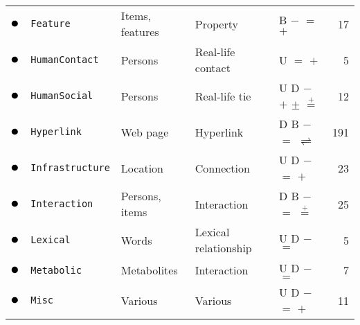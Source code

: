 \begin{tabular}{lllllr}
\textcolor{colorFeature}{$\newmoon$} &\texttt{Feature} & Items, features & Property & \phantom{U} \phantom{D} B $-$ $=$ $+$ \phantom{$\pm$} \phantom{$\stackrel{+}{=}$} \phantom{$*$} \phantom{$_*{}^*$} \phantom{$\rightleftharpoons$} \phantom{$++$}  &  17\\
\textcolor{colorHumanContact}{$\newmoon$} &\texttt{HumanContact} & Persons & Real-life contact & U \phantom{D} \phantom{B} \phantom{$-$} $=$ $+$ \phantom{$\pm$} \phantom{$\stackrel{+}{=}$} \phantom{$*$} \phantom{$_*{}^*$} \phantom{$\rightleftharpoons$} \phantom{$++$}  &  5\\
\textcolor{colorHumanSocial}{$\newmoon$} &\texttt{HumanSocial} & Persons & Real-life tie & U D \phantom{B} $-$ \phantom{$=$} $+$ $\pm$ $\stackrel{+}{=}$ \phantom{$*$} \phantom{$_*{}^*$} \phantom{$\rightleftharpoons$} \phantom{$++$}  &  12\\
\textcolor{colorHyperlink}{$\newmoon$} &\texttt{Hyperlink} & Web page & Hyperlink & \phantom{U} D B $-$ $=$ \phantom{$+$} \phantom{$\pm$} \phantom{$\stackrel{+}{=}$} \phantom{$*$} \phantom{$_*{}^*$} $\rightleftharpoons$ \phantom{$++$}  &  191\\
\textcolor{colorInfrastructure}{$\newmoon$} &\texttt{Infrastructure} & Location & Connection & U D \phantom{B} $-$ $=$ $+$ \phantom{$\pm$} \phantom{$\stackrel{+}{=}$} \phantom{$*$} \phantom{$_*{}^*$} \phantom{$\rightleftharpoons$} \phantom{$++$}  &  23\\
\textcolor{colorInteraction}{$\newmoon$} &\texttt{Interaction} & Persons, items & Interaction & \phantom{U} D B $-$ $=$ \phantom{$+$} \phantom{$\pm$} $\stackrel{+}{=}$ \phantom{$*$} \phantom{$_*{}^*$} \phantom{$\rightleftharpoons$} \phantom{$++$}  &  25\\
\textcolor{colorLexical}{$\newmoon$} &\texttt{Lexical} & Words & Lexical relationship & U D \phantom{B} $-$ $=$ \phantom{$+$} \phantom{$\pm$} \phantom{$\stackrel{+}{=}$} \phantom{$*$} \phantom{$_*{}^*$} \phantom{$\rightleftharpoons$} \phantom{$++$}  &  5\\
\textcolor{colorMetabolic}{$\newmoon$} &\texttt{Metabolic} & Metabolites & Interaction & U D \phantom{B} $-$ $=$ \phantom{$+$} \phantom{$\pm$} \phantom{$\stackrel{+}{=}$} \phantom{$*$} \phantom{$_*{}^*$} \phantom{$\rightleftharpoons$} \phantom{$++$}  &  7\\
\textcolor{colorMisc}{$\newmoon$} &\texttt{Misc} & Various & Various & U D \phantom{B} $-$ $=$ $+$ \phantom{$\pm$} \phantom{$\stackrel{+}{=}$} \phantom{$*$} \phantom{$_*{}^*$} \phantom{$\rightleftharpoons$} \phantom{$++$}  &  11\\

\end{tabular}
